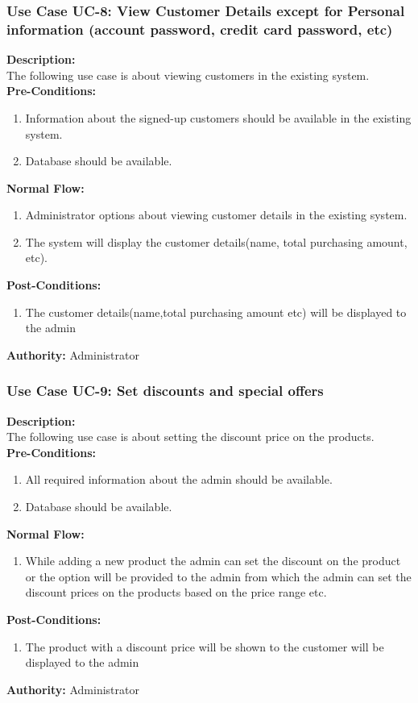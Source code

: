 \subsubsection{ Use Case UC-8: View Customer Details except for Personal information (account password, credit card password, etc)}
\textbf{Description:}\\
The following use case is about viewing customers in the existing system.
\\
\textbf{Pre-Conditions:}
\begin{enumerate}
\item  Information about the signed-up customers should be available in the existing system.    
\item Database should be available.
\end{enumerate}
\textbf{Normal Flow:}\\
\begin{enumerate}
\item Administrator options about viewing customer details in the existing system.
\item The system will display the customer details(name, total purchasing amount, etc).
\end{enumerate}
\textbf{Post-Conditions: }
\begin{enumerate}
\item	The customer details(name,total purchasing amount etc) will be displayed to the admin
\end{enumerate}
\textbf{Authority:}
Administrator
\subsubsection{ Use Case UC-9: Set discounts and special offers}
\textbf{Description:}\\
The following use case is about setting the discount price on the products.
\\
\textbf{Pre-Conditions:}
\begin{enumerate}
    \item  All required information about the admin should be available.
    \item Database should be available.
\end{enumerate}
\textbf{Normal Flow:}\\
\begin{enumerate}
\item While adding a new product the admin can set the discount on the product or the option will be provided to the admin from which the admin can set the discount prices on the products based on the price range etc.
\end{enumerate}
\textbf{Post-Conditions: }
\begin{enumerate}
\item	The product with a discount price will be shown to the customer will be displayed to the admin
\end{enumerate}
\textbf{Authority:}
Administrator
